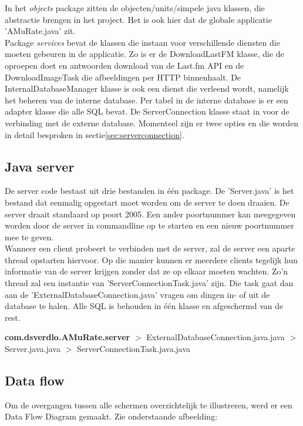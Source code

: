 \documentclass[11pt,a4paper]{article}
\newcommand{\pack}[1]{$>$ #1.java \newline}
\begin{document}
		In het \textit{objects} package zitten de objecten/units/simpele java klassen, die abstractie brengen in het project. Het is ook hier dat de globale applicatie 'AMuRate.java' zit.  \\
		
		Package \textit{services} bevat de klassen die instaan voor verschillende diensten die moeten gebeuren in de applicatie. Zo is er de DownloadLastFM klasse, die de oproepen doet en antwoorden download van de Last.fm API en de DownloadImageTask die afbeeldingen per HTTP binnenhaalt. De InternalDatabaseManager klasse is ook een dienst die verleend wordt, namelijk het beheren van de interne database. Per tabel in de interne database is er een adapter klasse die alle SQL bevat. De ServerConnection klasse staat in voor de verbinding met de externe database. Momenteel zijn er twee opties en die worden in detail besproken in sectie\ref{sec:serverconnection}.

	\subsection{Java server}
	\label{sec:Java server}
	De server code bestaat uit drie bestanden in één package. De 'Server.java' is het bestand dat eenmalig opgestart moet worden om de server te doen draaien. De server draait standaard op poort 2005. Een ander poortnummer kan meegegeven worden door de server in commandline op te starten en een nieuw poortnummer mee te geven. \\
	Wanneer een client probeert te verbinden met de server, zal de server een aparte thread opstarten hiervoor. Op die manier kunnen er meerdere clients tegelijk hun informatie van de server krijgen zonder dat ze op elkaar moeten wachten. Zo'n thread zal een instantie van 'ServerConnectionTask.java' zijn. Die task gaat dan aan de 'ExternalDatabaseConnection.java' vragen om dingen in- of uit de database te halen. Alle SQL is behouden in één klasse en afgeschermd van de rest.
	
	\textbf{com.dsverdlo.AMuRate.server} \newline
	\pack{ExternalDatabaseConnection.java}
	\pack{Server.java}
	\pack{ServerConnectionTask.java}
	
	\subsection{Data flow}
	\label{sec:Data flow}
	Om de overgangen tussen alle schermen overzichtelijk te illustreren, werd er een Data Flow Diagram gemaakt. Zie onderstaande afbeelding: \newline
	
\end{document}
